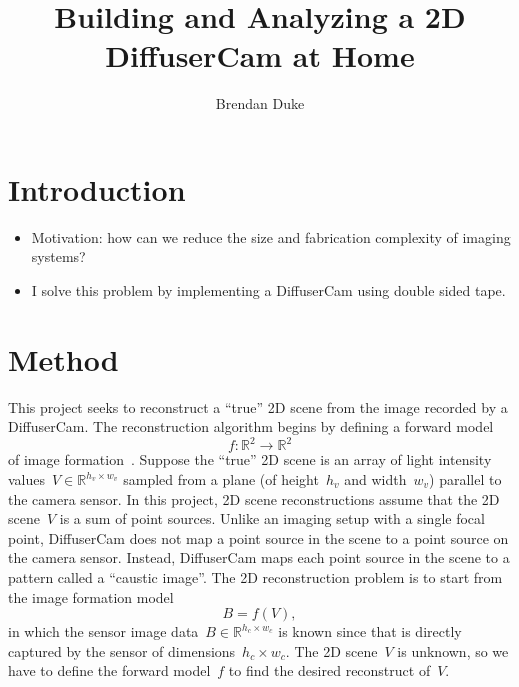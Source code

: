 \documentclass[final]{cvpr}
\begin{document}
\title{Building and Analyzing a 2D DiffuserCam at Home}

\author{Brendan Duke}

\maketitle

\begin{abstract}
\end{abstract}

\section{Introduction}

\begin{itemize}
	\item Motivation: how can we reduce the size and fabrication complexity
	      of imaging systems?

	\item I solve this problem by implementing a DiffuserCam using double
	      sided tape.
\end{itemize}


\section{Method}

\noindent This project seeks to reconstruct a ``true'' 2D scene from the image
recorded by a DiffuserCam.
The reconstruction algorithm begins by defining a forward
model
\begin{equation}
	f : \mathbb{R}^2 \rightarrow \mathbb{R}^2
	\label{eqn:forward-model}
\end{equation}
of image formation~\cite{biscarrat2018diffuseralgo}.
Suppose the ``true'' 2D scene is an array of light intensity
values~$V\in\mathbb{R}^{h_v\times w_v}$ sampled from a plane (of height~$h_v$ and
width~$w_v$) parallel to the camera sensor.
In this project, 2D scene reconstructions assume that the 2D scene~$V$ is a sum
of point sources.
Unlike an imaging setup with a single focal point, DiffuserCam does not map a
point source in the scene to a point source on the camera sensor.
Instead, DiffuserCam maps each point source in the scene to a pattern called a
``caustic image''.
The 2D reconstruction problem is to start from the image formation model
\begin{equation}
	B = f(V),
	\label{eqn:image-formation}
\end{equation}
in which the sensor image data~$B\in\mathbb{R}^{h_c\times w_c}$ is known since
that is directly captured by the sensor of dimensions~$h_c\times w_c$.
The 2D scene~$V$ is unknown, so we have to define the forward model~$f$ to find
the desired reconstruct of~$V$.
\end{document}
